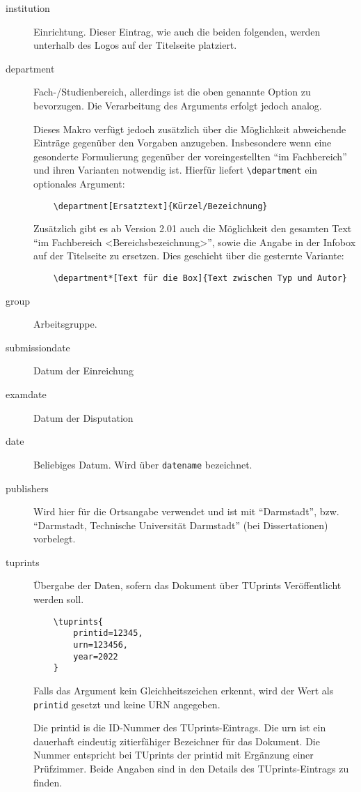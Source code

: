\documentclass[
	german,%
	ruledheaders=section,%
	class=report,%
	thesis={type=bachelor},%
	fontsize=11pt,%
	parskip=half-,%
	custommargins=true,%
	marginpar=false,%
	accentcolor=9c,%
]{tudapub}
\let\code\texttt
\begin{document}
\begin{description}
	\item[institution] Einrichtung.
	      Dieser Eintrag, wie auch die beiden folgenden, werden unterhalb des Logos auf der Titelseite platziert.
	\item[department] Fach-/Studienbereich, allerdings ist die oben genannte Option zu bevorzugen.
	      Die Verarbeitung des Arguments erfolgt jedoch analog.

	      Dieses Makro verfügt jedoch zusätzlich über die Möglichkeit abweichende Einträge gegenüber den Vorgaben anzugeben.
	      Insbesondere wenn eine gesonderte Formulierung gegenüber der voreingestellten \enquote{im Fachbereich} und ihren Varianten notwendig ist.
	      Hierfür liefert \code{\textbackslash{}department} ein optionales Argument:

\begin{verbatim}
    \department[Ersatztext]{Kürzel/Bezeichnung}
\end{verbatim}
 Zusätzlich gibt es ab Version 2.01 auch die Möglichkeit den gesamten Text \enquote{im Fachbereich <Bereichsbezeichnung>}, sowie die Angabe in der Infobox auf der Titelseite zu ersetzen.
	      Dies geschieht über die gesternte Variante:
\begin{verbatim}
    \department*[Text für die Box]{Text zwischen Typ und Autor}
\end{verbatim}
	\item[group] Arbeitsgruppe.
	\item[submissiondate] Datum der Einreichung
	\item[examdate] Datum der Disputation
	\item[date] Beliebiges Datum.
	      Wird über \verb|datename| bezeichnet.
	\item[publishers] Wird hier für die Ortsangabe verwendet und ist mit \enquote{Darmstadt}, bzw. \enquote{Darmstadt, Technische Universität Darmstadt} (bei Dissertationen) vorbelegt.
	\item[tuprints] \label{page:tuprints}Übergabe der Daten, sofern das Dokument über TUprints Veröffentlicht werden soll.
\begin{verbatim}
    \tuprints{
        printid=12345,
        urn=123456,
        year=2022
    }
\end{verbatim}
	      Falls das Argument kein Gleichheitszeichen erkennt, wird der Wert als \code{printid} gesetzt und keine URN angegeben.

	      Die printid is die ID-Nummer des TUprints-Eintrags.
	      Die urn ist ein dauerhaft eindeutig zitierfähiger Bezeichner für das Dokument.
	      Die Nummer entspricht bei TUprints der printid mit Ergänzung einer Prüfzimmer.
	      Beide Angaben sind in den Details des TUprints-Eintrags zu finden.


\end{description}
\end{document}
